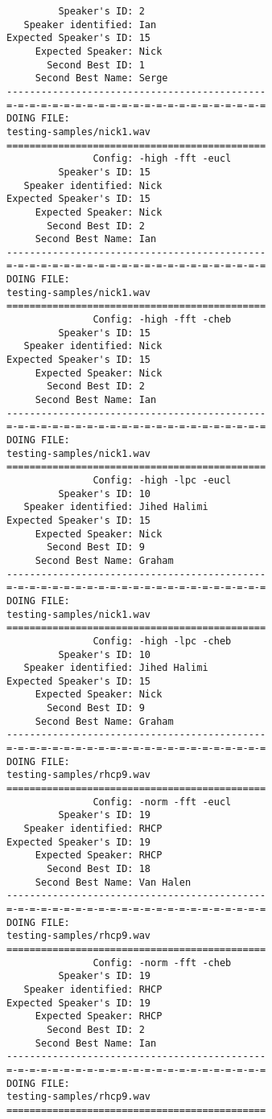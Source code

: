 \begin{verbatim}
         Speaker's ID: 2
   Speaker identified: Ian
Expected Speaker's ID: 15
     Expected Speaker: Nick
       Second Best ID: 1
     Second Best Name: Serge
---------------------------------------------
=-=-=-=-=-=-=-=-=-=-=-=-=-=-=-=-=-=-=-=-=-=-=
DOING FILE:
testing-samples/nick1.wav
=============================================
               Config: -high -fft -eucl
         Speaker's ID: 15
   Speaker identified: Nick
Expected Speaker's ID: 15
     Expected Speaker: Nick
       Second Best ID: 2
     Second Best Name: Ian
---------------------------------------------
=-=-=-=-=-=-=-=-=-=-=-=-=-=-=-=-=-=-=-=-=-=-=
DOING FILE:
testing-samples/nick1.wav
=============================================
               Config: -high -fft -cheb
         Speaker's ID: 15
   Speaker identified: Nick
Expected Speaker's ID: 15
     Expected Speaker: Nick
       Second Best ID: 2
     Second Best Name: Ian
---------------------------------------------
=-=-=-=-=-=-=-=-=-=-=-=-=-=-=-=-=-=-=-=-=-=-=
DOING FILE:
testing-samples/nick1.wav
=============================================
               Config: -high -lpc -eucl
         Speaker's ID: 10
   Speaker identified: Jihed Halimi
Expected Speaker's ID: 15
     Expected Speaker: Nick
       Second Best ID: 9
     Second Best Name: Graham
---------------------------------------------
=-=-=-=-=-=-=-=-=-=-=-=-=-=-=-=-=-=-=-=-=-=-=
DOING FILE:
testing-samples/nick1.wav
=============================================
               Config: -high -lpc -cheb
         Speaker's ID: 10
   Speaker identified: Jihed Halimi
Expected Speaker's ID: 15
     Expected Speaker: Nick
       Second Best ID: 9
     Second Best Name: Graham
---------------------------------------------
=-=-=-=-=-=-=-=-=-=-=-=-=-=-=-=-=-=-=-=-=-=-=
DOING FILE:
testing-samples/rhcp9.wav
=============================================
               Config: -norm -fft -eucl
         Speaker's ID: 19
   Speaker identified: RHCP
Expected Speaker's ID: 19
     Expected Speaker: RHCP
       Second Best ID: 18
     Second Best Name: Van Halen
---------------------------------------------
=-=-=-=-=-=-=-=-=-=-=-=-=-=-=-=-=-=-=-=-=-=-=
DOING FILE:
testing-samples/rhcp9.wav
=============================================
               Config: -norm -fft -cheb
         Speaker's ID: 19
   Speaker identified: RHCP
Expected Speaker's ID: 19
     Expected Speaker: RHCP
       Second Best ID: 2
     Second Best Name: Ian
---------------------------------------------
=-=-=-=-=-=-=-=-=-=-=-=-=-=-=-=-=-=-=-=-=-=-=
DOING FILE:
testing-samples/rhcp9.wav
=============================================

\end{verbatim}
